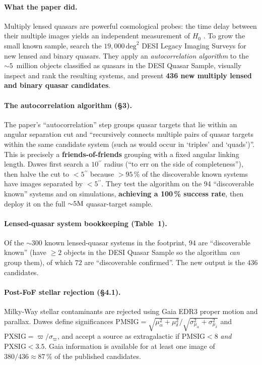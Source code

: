 \documentclass[11pt,letterpaper]{article}
\newcommand{\asec}{\ensuremath{^{\prime\prime}}}
\newcommand{\PMSIG}{\ensuremath{\mathrm{PMSIG}}}
\newcommand{\PXSIG}{\ensuremath{\mathrm{PXSIG}}}
\newcommand{\degsq}{\ensuremath{\mathrm{deg}^2}}
\begin{document}
\paragraph{What the paper did.} Multiply lensed quasars are powerful
cosmological probes: the time delay between their multiple images yields
an independent measurement of $H_0$
\autocite{treu2016marshall,dawes2023quasars}. To grow the small known
sample, \citet{dawes2023quasars} search the $19{,}000\,\degsq$ DESI Legacy
Imaging Surveys \autocite{dey2019legacysurveys} for new lensed and binary
quasars. They apply an \emph{autocorrelation algorithm} to the
${\sim}5$~million objects classified as quasars in the DESI Quasar Sample,
visually inspect and rank the resulting systems, and present
\textbf{436 new multiply lensed and binary quasar candidates}.

\paragraph{The autocorrelation algorithm (\S3).} The paper's
``autocorrelation'' step groups quasar targets that lie within an angular
separation cut and ``recursively connects multiple pairs of quasar targets
within the same candidate system (such as would occur in `triples' and
`quads')''. This is precisely a \textbf{friends-of-friends} grouping with a
fixed angular linking length. Dawes first search a $10\asec$ radius
(``to err on the side of completeness''), then halve the cut to ${<}5\asec$
because ${>}95\,\%$ of the discoverable known systems have images separated
by ${<}5\asec$. They test the algorithm on the 94 ``discoverable known''
systems and on simulations, \textbf{achieving a 100\,\% success rate}, then
deploy it on the full ${\sim}5{\rm M}$ quasar-target sample.

\paragraph{Lensed-quasar system bookkeeping (Table~1).} Of the
${\sim}300$ known lensed-quasar systems in the footprint, $94$ are
``discoverable known'' (have $\geq 2$ objects in the DESI Quasar Sample so
the algorithm \emph{can} group them), of which $72$ are ``discoverable
confirmed''. The new output is the $436$ candidates.

\paragraph{Post-FoF stellar rejection (\S4.1).} Milky-Way stellar
contaminants are rejected using Gaia EDR3 \autocite{gaiaedr3} proper motion
and parallax. Dawes define significances
$\PMSIG = \sqrt{\mu_\alpha^2 + \mu_\delta^2}/\sqrt{\sigma_{\mu_\alpha}^2 +
\sigma_{\mu_\delta}^2}$ and $\PXSIG = \varpi/\sigma_\varpi$, and accept a
source as extragalactic if $\PMSIG < 8$ \emph{and} $\PXSIG < 3.5$. Gaia
information is available for at least one image of $380/436 \approx 87\,\%$
of the published candidates.
\end{document}
